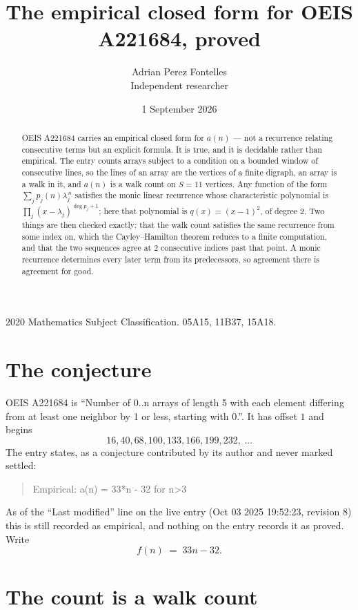 \documentclass[11pt,a4paper]{article}
\title{The empirical closed form for OEIS A221684, proved}
\author{Adrian Perez Fontelles\\ \small Independent researcher}
\date{1 September 2026}
\theoremstyle{plain}
\theoremstyle{definition}
\begin{document}
\maketitle

\begin{abstract}
OEIS A221684 carries an empirical closed form for $a(n)$ --- not a recurrence relating
consecutive terms but an explicit formula. It is true, and it is decidable rather than
empirical. The entry counts arrays subject to a condition on a bounded window of consecutive lines, so the lines of an array are the
vertices of a finite digraph, an array is a walk in it, and $a(n)$ is a walk count on
$S=11$ vertices. Any function of the form $\sum_j p_j(n)\lambda_j^{\,n}$ satisfies the
monic linear recurrence whose characteristic polynomial is
$\prod_j(x-\lambda_j)^{\deg p_j+1}$; here that polynomial is $q(x)=(x-1)^{2}$, of degree
$2$. Two things are then checked exactly: that the walk count satisfies the same
recurrence from some index on, which the Cayley--Hamilton theorem reduces to a finite
computation, and that the two sequences agree at $2$ consecutive indices past that
point. A monic recurrence determines every later term from its predecessors, so agreement
there is agreement for good.
\end{abstract}

\noindent\small 2020 Mathematics Subject Classification. 05A15, 11B37, 15A18.\normalsize

\section{The conjecture}

OEIS A221684 is ``Number of 0..n arrays of length 5 with each element differing from at least one neighbor by 1 or less, starting with 0.''. It has offset $1$ and begins
\[
16, 40, 68, 100, 133, 166, 199, 232,\ \dots
\]
The entry states, as a conjecture contributed by its author and never marked settled:
\begin{quote}
Empirical: a(n) = 33*n - 32 for n>3
\end{quote}
As of the ``Last modified'' line on the live entry (Oct 03 2025 19:52:23, revision 8) this is still
recorded as empirical, and nothing on the entry records it as proved. Write
\[
f(n)\;=\;33 n - 32.
\]

\section{The count is a walk count}
\end{document}
